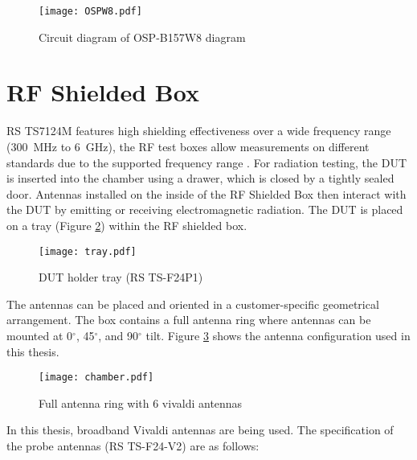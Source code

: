 \begin{figure}[H]
\centering
\texttt{[image: OSPW8.pdf]}
\caption{Circuit diagram of \acs{OSP}-B157W8 diagram \cite{ospw8}}
\label{fig:ospw8}
\end{figure}



\section{\acs{RF} Shielded Box}
\acs{RS}\textregistered{} TS7124M features high shielding effectiveness over a wide frequency range (300~MHz to 6~GHz), the \acs{RF} test boxes allow measurements on different standards due to the supported frequency range \cite{ts7124}. For radiation testing, the \acs{DUT} is inserted into the chamber using a drawer, which is closed by a tightly sealed door. Antennas installed on the inside of the \acs{RF} Shielded Box then interact with the \acs{DUT} by emitting or receiving electromagnetic radiation. The \acs{DUT} is placed on a tray (Figure \ref{fig:try}) within the \acs{RF} shielded box.

\begin{figure}[H]
\centering
\texttt{[image: tray.pdf]}
\caption{ DUT holder tray (\acs{RS}\textregistered{} TS-F24P1) \cite{ts7124}}
\label{fig:try}
\end{figure}

The antennas can be placed and oriented in a customer-specific geometrical arrangement. The box contains a full antenna ring where antennas can be mounted at 0$^{\circ}$, 45$^{\circ}$, and 90$^{\circ}$ tilt. Figure \ref{fig:box} shows the antenna configuration used in this thesis.

\begin{figure}[H]
\centering
\texttt{[image: chamber.pdf]}
\caption{Full antenna ring with 6 vivaldi antennas}
\label{fig:box}
\end{figure}

In this thesis, broadband Vivaldi antennas are being used. The specification of the probe antennas (\acs{RS}\textregistered{} TS-F24-V2) are as follows: 


